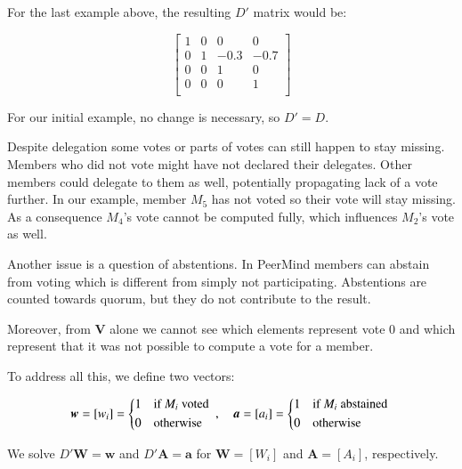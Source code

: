 \documentclass{sigchi}
\begin{document}
For the last example above, the resulting $D'$ matrix would be:

\begin{displaymath}
\left[ \begin{array}{cccc}
1 & 0 & 0 & 0 \\
0 & 1 & -0.3 & -0.7 \\
0 & 0 & 1 & 0 \\
0 & 0 & 0 & 1\\
\end{array} \right]
\end{displaymath}

For our initial example, no change is necessary, so $D' = D$.

Despite delegation some votes or parts of votes can still happen to stay missing.
Members who did not vote might have not declared their delegates.
Other members could delegate to them as well, potentially propagating lack of a vote further.
In our example, member $M_5$ has not voted so their vote will stay missing.
As a consequence $M_4$'s vote cannot be computed fully, which influences $M_2$'s vote as well.

Another issue is a question of abstentions.
In PeerMind members can abstain from voting which is different from simply not participating.
Abstentions are counted towards quorum, but they do not contribute to the result.

Moreover, from $\boldsymbol{V}$ alone we cannot see which elements represent vote $0$ and which
represent that it was not possible to compute a vote for a member.

To address all this, we define two vectors:

\begin{displaymath}
\boldsymbol{w} = \left[w_i\right] = \begin{dcases*}
 1 & if $M_i$ voted \\
 0 & otherwise \\
\end{dcases*},\quad \boldsymbol{a} = \left[a_i\right] = \begin{dcases*}
 1 & if $M_i$ abstained \\
 0 & otherwise \\
\end{dcases*}
\end{displaymath}

We solve $D' \boldsymbol{W} = \boldsymbol{w}$ and $D' \boldsymbol{A} = \boldsymbol{a}$ for
$\boldsymbol{W} = \left[W_{i}\right]$ and $\boldsymbol{A} = \left[A_{i}\right]$, respectively.
\end{document}
